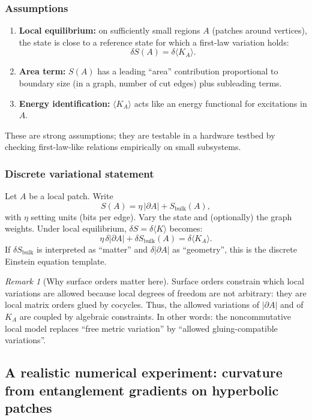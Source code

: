 \documentclass[11pt,oneside]{amsbook}
\numberwithin{equation}{section}
\theoremstyle{plain}
\theoremstyle{definition}
\theoremstyle{remark}
\newtheorem{remark}[theorem]{Remark}
\begin{document}
\subsubsection{Assumptions}
\begin{enumerate}
\item \textbf{Local equilibrium:} on sufficiently small regions $A$ (patches around vertices), the state is close to a reference state for which a first-law variation holds:
\[
\delta S(A) = \delta\langle K_A\rangle.
\]
\item \textbf{Area term:} $S(A)$ has a leading ``area'' contribution proportional to boundary size (in a graph, number of cut edges) plus subleading terms.
\item \textbf{Energy identification:} $\langle K_A\rangle$ acts like an energy functional for excitations in $A$.
\end{enumerate}

These are strong assumptions; they are testable in a hardware testbed by checking first-law-like relations empirically on small subsystems.

\subsubsection{Discrete variational statement}
Let $A$ be a local patch.
Write
\[
S(A)=\eta\,|\partial A| + S_{\mathrm{bulk}}(A),
\]
with $\eta$ setting units (bits per edge).
Vary the state and (optionally) the graph weights.
Under local equilibrium, $\delta S = \delta\langle K\rangle$ becomes:
\[
\eta\,\delta|\partial A| + \delta S_{\mathrm{bulk}}(A) = \delta\langle K_A\rangle.
\]
If $\delta S_{\mathrm{bulk}}$ is interpreted as ``matter'' and $\delta|\partial A|$ as ``geometry'', this is the discrete Einstein equation template.

\begin{remark}[Why surface orders matter here]
Surface orders constrain which local variations are allowed because local degrees of freedom are not arbitrary: they are local matrix orders glued by cocycles.
Thus, the allowed variations of $|\partial A|$ and of $K_A$ are coupled by algebraic constraints.
In other words: the noncommutative local model replaces ``free metric variation'' by ``allowed gluing-compatible variations''.
\end{remark}

\subsection{A realistic numerical experiment: curvature from entanglement gradients on hyperbolic patches}
\label{sec:hyperbolic_expt}
\end{document}
